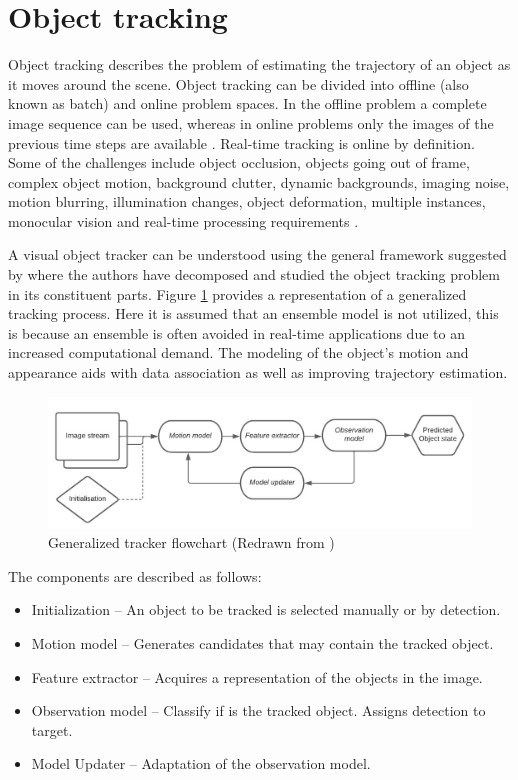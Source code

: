 \documentclass[a4paper,twoside,12pt]{report}
\begin{document}
\section{Object tracking}

Object tracking describes the problem of estimating the trajectory of an object as it moves around the scene. Object tracking can be divided into offline (also known as batch) and online problem spaces. In the offline problem a complete image sequence can be used, whereas in online problems only the images of the previous time steps are available  \citep{track0}. Real-time tracking is online by definition. Some of the challenges include object occlusion, objects going out of frame, complex object motion, background clutter, dynamic backgrounds, imaging noise, motion blurring, illumination changes, object deformation, multiple instances, monocular vision and real-time processing requirements \citep{tradtrack0}.

A visual object tracker can be understood using the general framework suggested by \cite{diagnosingtrack} where the authors have decomposed and studied the object tracking problem in its constituent parts. Figure \ref{fig:tracker} provides a representation of a generalized tracking process. Here it is assumed that an ensemble model is not utilized, this is because an ensemble is often avoided in real-time applications due to an increased computational demand. The modeling of the object's motion and appearance aids with data association as well as improving trajectory estimation. \citep{sort}  

\begin{figure}[h!]
\begin{center}
\includegraphics[width=13.5cm]{images/Tracking_flowchart.jpeg}
\caption{Generalized tracker flowchart (Redrawn from \cite{diagnosingtrack})}
\label{fig:tracker}
\end{center}
\end{figure}

\pagebreak
The components are described as follows:

\begin{itemize}
    \item Initialization -- An object to be tracked is selected manually or by detection.
    \item Motion model -- Generates candidates that may contain the tracked object.
    \item Feature extractor -- Acquires a representation of the objects in the image.
    \item Observation model -- Classify if is the tracked object. Assigns detection to target.
    \item Model Updater -- Adaptation of the observation model.
\end{itemize}
\end{document}
